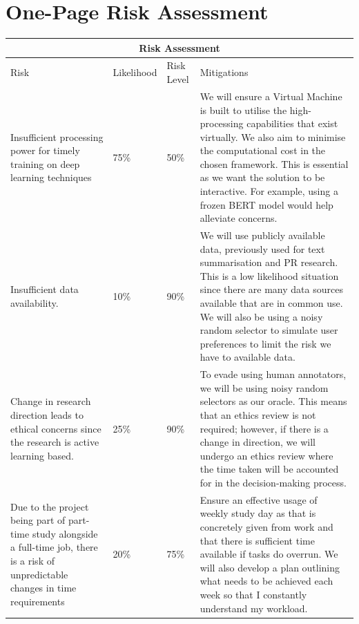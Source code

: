 \documentclass[ %
                    author={James Stephenson},
                supervisor={Dr. Edwin Simpson},
                    degree={MSc},
                     title={PROJECT PLAN},
                  subtitle={Bayesian Deep Learning For Extractive Test Summarisation},
                      type={},
                      year={2022}]{../additions/dissertation}
\begin{document}
	\chapter{One-Page Risk Assessment}
		\label{appx:riskassessment}
		
		\begin{tabular}{ |p{5cm}||p{2cm}|p{2cm}|p{6cm}|  }
 			\hline
 			\multicolumn{4}{|c|}{Risk Assessment} \\
			\hline
 			Risk& Likelihood &Risk Level&Mitigations\\
 			\hline
 			Insufficient processing power for timely training on deep learning techniques   & 75\%    &50\%&  We will ensure a Virtual Machine is built to utilise the high-processing capabilities that exist virtually. We also aim to minimise the computational cost in the chosen framework. This is essential as we want the solution to be interactive. For example, using a frozen BERT model would help alleviate concerns. \\
			\hline
 			Insufficient data availability.&10\% & 90\%  & We will use publicly available data, previously used for text summarisation and PR research. This is a low likelihood situation since there are many data sources available that are in common use. We will also be using a noisy random selector to simulate user preferences to limit the risk we have to available data.\\
			\hline
 			Change in research direction leads to ethical concerns since the research is active learning based. &25\% & 90\%& To evade using human annotators, we will be using noisy random selectors as our oracle. This means that an ethics review is not required; however, if there is a change in direction, we will undergo an ethics review where the time taken will be accounted for in the decision-making process.\\
			\hline
 			Due to the project being part of part-time study alongside a full-time job, there is a risk of unpredictable changes in time requirements    &20\% & 75\%& Ensure an effective usage of weekly study day as that is concretely given from work and that there is sufficient time available if tasks do overrun. We will also develop a plan outlining what needs to be achieved each week so that I constantly understand my workload.\\
 			\hline
		\end{tabular}
		
\end{document}
